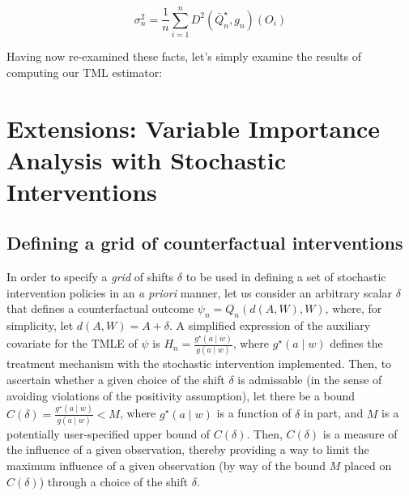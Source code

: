\documentclass[
  12pt, krantz2,
]{krantz}
\theoremstyle{definition}
\theoremstyle{definition}
\theoremstyle{definition}
\newcommand{\1}{\mathbbm{1}}
\begin{document}
\[\sigma_n^2 = \frac{1}{n} \sum_{i = 1}^{n} D^2(\bar{Q}_n^{\star}, g_n)(O_i)\]

Having now re-examined these facts, let's simply examine the results of
computing our TML estimator:

\hypertarget{extensions-variable-importance-analysis-with-stochastic-interventions}{%
\section{Extensions: Variable Importance Analysis with Stochastic Interventions}\label{extensions-variable-importance-analysis-with-stochastic-interventions}}

\hypertarget{defining-a-grid-of-counterfactual-interventions}{%
\subsection{Defining a grid of counterfactual interventions}\label{defining-a-grid-of-counterfactual-interventions}}

In order to specify a \emph{grid} of shifts \(\delta\) to be used in defining a set of
stochastic intervention policies in an \emph{a priori} manner, let us consider an
arbitrary scalar \(\delta\) that defines a counterfactual outcome \(\psi_n = Q_n(d(A, W), W)\), where, for simplicity, let \(d(A, W) = A + \delta\). A
simplified expression of the auxiliary covariate for the TMLE of \(\psi\) is
\(H_n = \frac{g^{\star}(a \mid w)}{g(a \mid w)}\), where \(g^{\star}(a \mid w)\)
defines the treatment mechanism with the stochastic intervention implemented.
Then, to ascertain whether a given choice of the shift \(\delta\) is admissable
(in the sense of avoiding violations of the positivity assumption), let there
be a bound \(C(\delta) = \frac{g^{\star}(a \mid w)}{g(a \mid w)} < M\), where
\(g^{\star}(a \mid w)\) is a function of \(\delta\) in part, and \(M\) is a potentially
user-specified upper bound of \(C(\delta)\). Then, \(C(\delta)\) is a measure of
the influence of a given observation, thereby providing a way to limit the
maximum influence of a given observation (by way of the bound \(M\) placed on
\(C(\delta)\)) through a choice of the shift \(\delta\).
\end{document}
